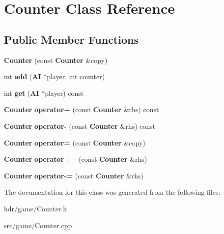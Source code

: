 \section{Counter Class Reference}
\label{class_counter}
\subsection*{Public Member Functions}
\begin{DoxyCompactItemize}
\item 
{\bfseries Counter} (const {\bf Counter} \&copy)\label{class_counter_ae36386566b1cc1bfbce065dd182e1e1e}

\item 
int {\bfseries add} ({\bf A\-I} $\ast$player, int counter)\label{class_counter_a7f4afd6b55161dee82b1e046af77924b}

\item 
int {\bfseries get} ({\bf A\-I} $\ast$player) const \label{class_counter_a95c8f10bc296a35599cb97f3dc33f0e9}

\item 
{\bf Counter} {\bfseries operator+} (const {\bf Counter} \&rhs) const \label{class_counter_af13b8092fbef704e68fdefb2d024683a}

\item 
{\bf Counter} {\bfseries operator-\/} (const {\bf Counter} \&rhs) const \label{class_counter_a563604893f4bc66449ac9901928ebbc4}

\item 
{\bf Counter} {\bfseries operator=} (const {\bf Counter} \&copy)\label{class_counter_a683fff5c5b2fb7082f637a817106ec4f}

\item 
{\bf Counter} {\bfseries operator+=} (const {\bf Counter} \&rhs)\label{class_counter_a0923b8779d18168542db7281bdb7c6c2}

\item 
{\bf Counter} {\bfseries operator-\/=} (const {\bf Counter} \&rhs)\label{class_counter_a99857e9ec0584d6525fc49e00223b555}

\end{DoxyCompactItemize}


The documentation for this class was generated from the following files\-:\begin{DoxyCompactItemize}
\item 
hdr/game/Counter.\-h\item 
src/game/Counter.\-cpp\end{DoxyCompactItemize}
